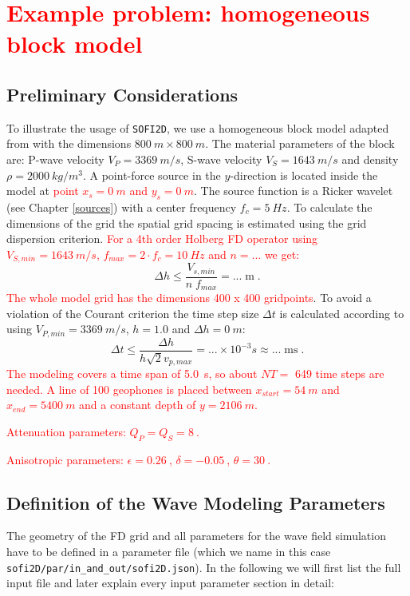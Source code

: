 \section{\textcolor{red}{Example problem: homogeneous block model}}
\label{example}

\subsection{Preliminary Considerations}
To illustrate the usage of \texttt{SOFI2D}, we use a homogeneous block model adapted from with the dimensions $\SI{800}{m} \times \SI{800}{m}$. The material parameters of the block are: P-wave velocity $V_P=\SI{3369}{m/s}$, S-wave velocity $V_S=\SI{1643}{m/s}$ and density $\rho=\SI{2000}{kg/m^3}$. A point-force source in the $y$-direction is located inside the model at \textcolor{red}{point $x_s=\SI{0}{m}$ and $y_s=\SI{0}{m}$}. The source function is a Ricker wavelet (see Chapter \ref{sources}) with a center frequency $f_c=\SI{5}{Hz}$. To calculate the dimensions of the grid the spatial grid spacing is estimated using the grid dispersion criterion. \textcolor{red}{For a 4th order Holberg FD operator using $V_{S,min}=\SI{1643}{m/s}$, $f_{max}=2 \cdot f_c=\SI{10}{Hz}$ and $n=...$ we get:}
\begin{equation}
    \Delta h \le \frac{V_{s,min}}{n\; f_{max}} = ...\;\mathrm{m}\;.
\end{equation}
\textcolor{red}{The whole model grid has the dimensions 400 x 400 gridpoints}. To avoid a violation of the Courant criterion the time step size $\Delta t$ is calculated according to using $V_{P,min}=\SI{3369}{m/s}$, $h=1.0$ and $\Delta h=\SI{0}{m}$:
\begin{equation}
    \Delta t \le \frac{\Delta h}{h \sqrt{2} v_{p,max}} = ... \times 10^{-3} s \approx ...\; \mathrm{ms}\;.
\end{equation}
\textcolor{red}{The modeling covers a time span of \SI{5.0}{s}, so about $NT=$ 649 time steps are needed. A line of 100 geophones is placed between $x_{start}=\SI{54}{m}$ and $x_{end}=\SI{5400}{m}$ and a constant depth of $y=\SI{2106}{m}$.} 

\textcolor{red}{Attenuation parameters: $Q_P=Q_S=\SI{8}{}$.}

\textcolor{red}{Anisotropic parameters: $\epsilon=\SI{0.26}{}$, $\delta=\SI{-0.05}{}$, $\theta=\SI{30}{}$.}

\subsection{Definition of the Wave Modeling Parameters}
\label{modelgeom}
The geometry of the FD grid and all parameters for the wave field simulation have to be defined in a parameter file (which we name in this case {\texttt{sofi2D/par/in\_and\_out/sofi2D.json}}). In the following we will first list the full input file and later explain every input parameter section in detail:


